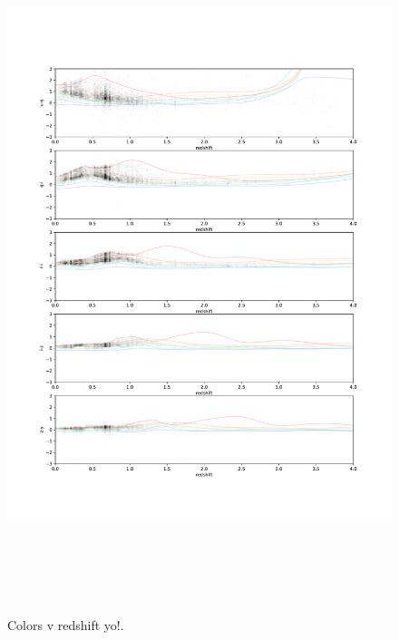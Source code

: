 \begin{figure}
    \centering
    \includegraphics[height=8in]{figures/color_v_redshift.pdf}
    \caption{Colors v redshift yo!.}
    \label{fig:dp_color_v_redshift}
\end{figure}


